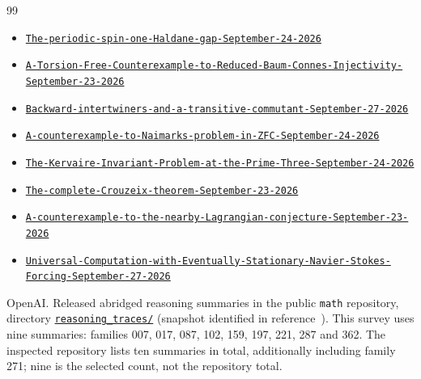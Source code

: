 \documentclass[11pt]{article}
\begin{document}
\begin{thebibliography}{99}
\begin{itemize}[nosep,leftmargin=2.2em,labelsep=0.5em]
\item[268] {\small \href{https://github.com/openai/math/tree/fd4aeeb2ee4fc729c18d98444fed42fd0529eeeb/preprints/The-periodic-spin-one-Haldane-gap-September-24-2026}{\nolinkurl{The-periodic-spin-one-Haldane-gap-September-24-2026}}}
\item[285] {\small \href{https://github.com/openai/math/tree/fd4aeeb2ee4fc729c18d98444fed42fd0529eeeb/preprints/A-Torsion-Free-Counterexample-to-Reduced-Baum-Connes-Injectivity-September-23-2026}{\nolinkurl{A-Torsion-Free-Counterexample-to-Reduced-Baum-Connes-Injectivity-September-23-2026}}}
\item[293] {\small \href{https://github.com/openai/math/tree/fd4aeeb2ee4fc729c18d98444fed42fd0529eeeb/preprints/Backward-intertwiners-and-a-transitive-commutant-September-27-2026}{\nolinkurl{Backward-intertwiners-and-a-transitive-commutant-September-27-2026}}}
\item[297] {\small \href{https://github.com/openai/math/tree/fd4aeeb2ee4fc729c18d98444fed42fd0529eeeb/preprints/A-counterexample-to-Naimarks-problem-in-ZFC-September-24-2026}{\nolinkurl{A-counterexample-to-Naimarks-problem-in-ZFC-September-24-2026}}}
\item[309] {\small \href{https://github.com/openai/math/tree/fd4aeeb2ee4fc729c18d98444fed42fd0529eeeb/preprints/The-Kervaire-Invariant-Problem-at-the-Prime-Three-September-24-2026}{\nolinkurl{The-Kervaire-Invariant-Problem-at-the-Prime-Three-September-24-2026}}}
\item[325] {\small \href{https://github.com/openai/math/tree/fd4aeeb2ee4fc729c18d98444fed42fd0529eeeb/preprints/The-complete-Crouzeix-theorem-September-23-2026}{\nolinkurl{The-complete-Crouzeix-theorem-September-23-2026}}}
\item[340] {\small \href{https://github.com/openai/math/tree/fd4aeeb2ee4fc729c18d98444fed42fd0529eeeb/preprints/A-counterexample-to-the-nearby-Lagrangian-conjecture-September-23-2026}{\nolinkurl{A-counterexample-to-the-nearby-Lagrangian-conjecture-September-23-2026}}}
\item[376] {\small \href{https://github.com/openai/math/tree/fd4aeeb2ee4fc729c18d98444fed42fd0529eeeb/preprints/Universal-Computation-with-Eventually-Stationary-Navier-Stokes-Forcing-September-27-2026}{\nolinkurl{Universal-Computation-with-Eventually-Stationary-Navier-Stokes-Forcing-September-27-2026}}}\end{itemize}
 OpenAI. Released abridged reasoning summaries in the public \texttt{math} repository, directory \href{https://github.com/openai/math/tree/fd4aeeb2ee4fc729c18d98444fed42fd0529eeeb/reasoning_traces}{\texttt{reasoning\_traces/}} (snapshot identified in reference~\cite{src:repo}). This survey uses nine summaries: families 007, 017, 087, 102, 159, 197, 221, 287 and 362. The inspected repository lists ten summaries in total, additionally including family 271; nine is the selected count, not the repository total.


\end{thebibliography}
\end{document}
